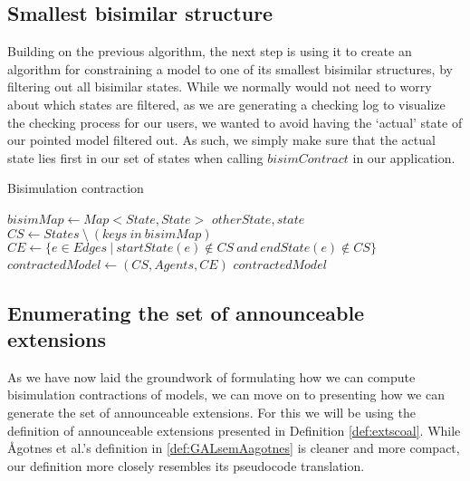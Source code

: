 \subsection{Smallest bisimilar structure}

Building on the previous algorithm, the next step is using it to create an algorithm for constraining a model to one of its smallest bisimilar structures, by filtering out all bisimilar states. While we normally would not need to worry about which states are filtered, as we are generating a checking log to visualize the checking process for our users, we wanted to avoid having the `actual' state of our pointed model filtered out. As such, we simply make sure that the actual state lies first in our set of states when calling $bisimContract$ in our application. 

\begin{algorithm}
	\caption{Bisimulation contraction}
	\label{alg:bisimContract}
	\begin{algorithmic}
			\State $bisimMap \gets Map<State, State>$
						\State {} {$otherState, state$}
					\EndIf
				\EndFor
			\EndFor
			\State $CS \gets States \ \setminus \ (keys \ in \ bisimMap)$
			\State $CE \gets \{ e \in Edges ~|~ startState(e) \not\in CS \ and \ endState(e) \not\in CS\}$
			\State $contractedModel \gets (CS, Agents, CE)$
			\State \Return $contractedModel$
		\EndFunction
	\end{algorithmic}
\end{algorithm}

\subsection{Enumerating the set of announceable extensions}

As we have now laid the groundwork of formulating how we can compute bisimulation contractions of models, we can move on to presenting how we can generate the set of announceable extensions. For this we will be using the definition of announceable extensions presented in Definition \ref{def:extscoal}. While Ågotnes et al.'s definition in \ref{def:GALsemAagotnes} is cleaner and more compact, our definition more closely resembles its pseudocode translation.

